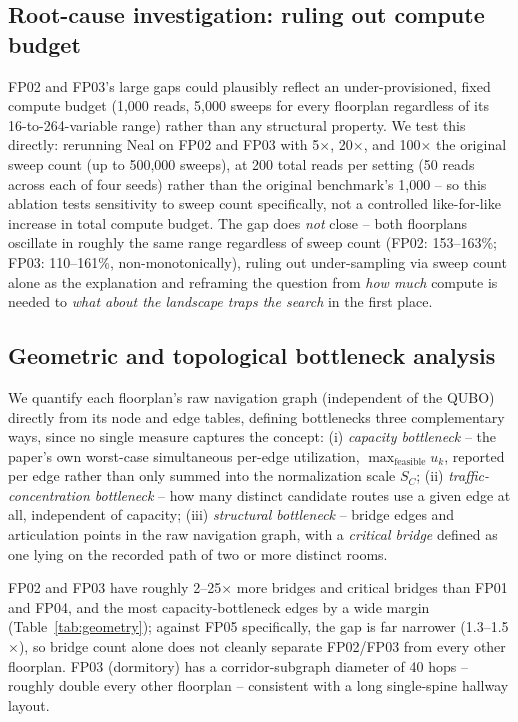 \documentclass[11pt]{article}
\begin{document}
\subsection{Root-cause investigation: ruling out compute budget}
\label{sec:budget}
FP02 and FP03's large gaps could plausibly reflect an under-provisioned, fixed compute budget (1,000 reads, 5,000 sweeps for every floorplan regardless of its 16-to-264-variable range) rather than any structural property. We test this directly: rerunning Neal on FP02 and FP03 with 5$\times$, 20$\times$, and 100$\times$ the original sweep count (up to 500,000 sweeps), at 200 total reads per setting (50 reads across each of four seeds) rather than the original benchmark's 1,000 -- so this ablation tests sensitivity to sweep count specifically, not a controlled like-for-like increase in total compute budget. The gap does \emph{not} close -- both floorplans oscillate in roughly the same range regardless of sweep count (FP02: 153--163\%; FP03: 110--161\%, non-monotonically), ruling out under-sampling via sweep count alone as the explanation and reframing the question from \emph{how much} compute is needed to \emph{what about the landscape traps the search} in the first place.

\subsection{Geometric and topological bottleneck analysis}
\label{sec:geometry}
We quantify each floorplan's raw navigation graph (independent of the QUBO) directly from its node and edge tables, defining bottlenecks three complementary ways, since no single measure captures the concept: (i) \textit{capacity bottleneck} -- the paper's own worst-case simultaneous per-edge utilization, $\max_{\text{feasible}} u_k$, reported per edge rather than only summed into the normalization scale $S_C$; (ii) \textit{traffic-concentration bottleneck} -- how many distinct candidate routes use a given edge at all, independent of capacity; (iii) \textit{structural bottleneck} -- bridge edges and articulation points in the raw navigation graph, with a \textit{critical bridge} defined as one lying on the recorded path of two or more distinct rooms.

FP02 and FP03 have roughly 2--25$\times$ more bridges and critical bridges than FP01 and FP04, and the most capacity-bottleneck edges by a wide margin (Table~\ref{tab:geometry}); against FP05 specifically, the gap is far narrower (1.3--1.5$\times$), so bridge count alone does not cleanly separate FP02/FP03 from every other floorplan. FP03 (dormitory) has a corridor-subgraph diameter of 40 hops -- roughly double every other floorplan -- consistent with a long single-spine hallway layout.
\end{document}
